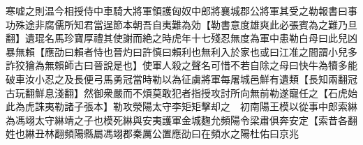 寒嘘之則温今相授侍中車騎大將軍領護匈奴中郎將襄城郡公將軍其受之勒報書曰事功殊途非腐儒所知君當逞節本朝吾自夷難為効【勒書意度雄爽此必張賓為之難乃旦翻】遺琨名馬珍寶厚禮其使謝而絶之時虎年十七殘忍無度為軍中患勒白母曰此兒凶暴無賴【應劭曰賴者恃也晉灼曰許慎曰賴利也無利入於家也或曰江准之間謂小兒多詐狡獪為無賴師古曰晉說是也】使軍人殺之聲名可惜不若自除之母曰快牛為犢多能破車汝小忍之及長便弓馬勇冠當時勒以為征虜將軍每屠城邑鮮有遺類【長知兩翻冠古玩翻鮮息淺翻】然御衆嚴而不煩莫敢犯者指授攻討所向無前勒遂寵任之【石虎始此為虎誅夷勒諸子張本】勒攻滎陽太守李矩矩擊却之　初南陽王模以從事中郎索綝為馮翊太守綝靖之子也模死綝與安夷護軍金城麴允頻陽令梁肅俱奔安定【索昔各翻姓也綝丑林翻頻陽縣屬馮翊郡秦厲公置應劭曰在頻水之陽杜佑曰京兆